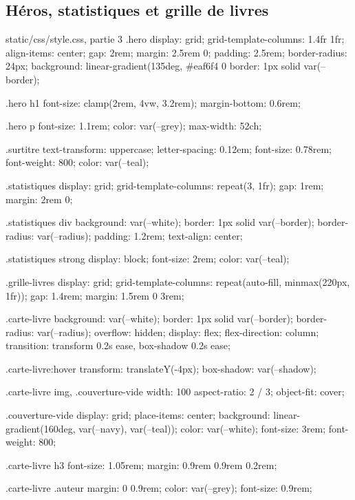 \subsection{Héros, statistiques et grille de livres}

\begin{codebox}[css]{static/css/style.css, partie 3}
.hero {
  display: grid;
  grid-template-columns: 1.4fr 1fr;
  align-items: center;
  gap: 2rem;
  margin: 2.5rem 0;
  padding: 2.5rem;
  border-radius: 24px;
  background: linear-gradient(135deg, #eaf6f4 0%
  border: 1px solid var(--border);
}

.hero h1 {
  font-size: clamp(2rem, 4vw, 3.2rem);
  margin-bottom: 0.6rem;
}

.hero p {
  font-size: 1.1rem;
  color: var(--grey);
  max-width: 52ch;
}

.surtitre {
  text-transform: uppercase;
  letter-spacing: 0.12em;
  font-size: 0.78rem;
  font-weight: 800;
  color: var(--teal);
}

.statistiques {
  display: grid;
  grid-template-columns: repeat(3, 1fr);
  gap: 1rem;
  margin: 2rem 0;
}

.statistiques div {
  background: var(--white);
  border: 1px solid var(--border);
  border-radius: var(--radius);
  padding: 1.2rem;
  text-align: center;
}

.statistiques strong {
  display: block;
  font-size: 2rem;
  color: var(--teal);
}

.grille-livres {
  display: grid;
  grid-template-columns: repeat(auto-fill, minmax(220px, 1fr));
  gap: 1.4rem;
  margin: 1.5rem 0 3rem;
}

.carte-livre {
  background: var(--white);
  border: 1px solid var(--border);
  border-radius: var(--radius);
  overflow: hidden;
  display: flex;
  flex-direction: column;
  transition: transform 0.2s ease, box-shadow 0.2s ease;
}

.carte-livre:hover {
  transform: translateY(-4px);
  box-shadow: var(--shadow);
}

.carte-livre img,
.couverture-vide {
  width: 100%
  aspect-ratio: 2 / 3;
  object-fit: cover;
}

.couverture-vide {
  display: grid;
  place-items: center;
  background: linear-gradient(160deg, var(--navy), var(--teal));
  color: var(--white);
  font-size: 3rem;
  font-weight: 800;
}

.carte-livre h3 {
  font-size: 1.05rem;
  margin: 0.9rem 0.9rem 0.2rem;
}

.carte-livre .auteur {
  margin: 0 0.9rem;
  color: var(--grey);
  font-size: 0.9rem;
}
\end{codebox}

